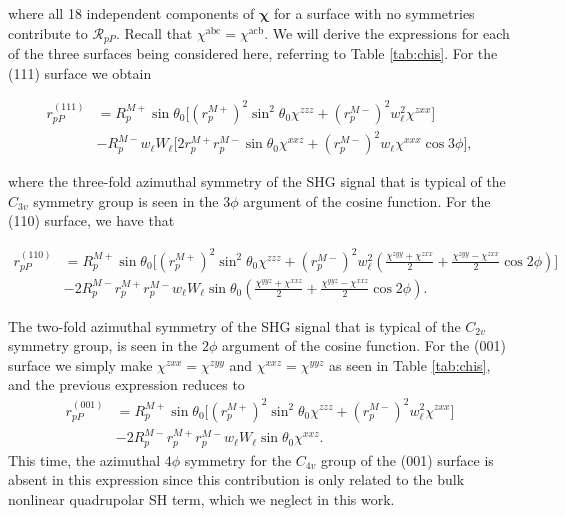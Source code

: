 \documentclass[aps,prb,10pt,showpacs,letterpaper,twocolumn]{revtex4-1}
\begin{document}
where all 18 independent components of $\boldsymbol{\chi}$ for a surface with no
symmetries contribute to $\mathcal{R}_{pP}$. Recall that $\chi^{\mathrm{abc}} =
\chi^{\mathrm{acb}}$. We will derive the expressions for each of the three
surfaces being considered here, referring to Table \ref{tab:chis}. For the (111)
surface we obtain
\begin{widetext}
\begin{equation}\label{eq:rpp111}
\begin{split}
r^{(111)}_{pP} &= 
R^{M+}_{p}\sin\theta_{0}
\Big[
  \left(r^{M+}_{p}\right)^{2}\sin^{2}\theta_{0}\chi^{zzz}
+ \left(r^{M-}_{p}\right)^{2}w^{2}_{\ell}\chi^{zxx}
\Big]\\
&- R^{M-}_{p}w_{\ell}W_{\ell}
\Big[
  2r^{M+}_{p}r^{M-}_{p}\sin\theta_{0}\chi^{xxz}
+ \left(r^{M-}_{p}\right)^{2}w_{\ell}\chi^{xxx}\cos3\phi
\Big],
\end{split}
\end{equation}
\end{widetext}
where the three-fold azimuthal symmetry of the SHG signal that is typical of the
$C_{3v}$ symmetry group is seen in the $3\phi$ argument of the cosine function.
For the (110) surface, we have that
\begin{widetext}
\begin{equation}\label{eq:rpp110}
\begin{split}
r^{(110)}_{pP} &= 
R^{M+}_{p}\sin\theta_{0}
\Bigg[
  \left(r^{M+}_{p}\right)^{2}\sin^{2}\theta_{0}\chi^{zzz}
+ \left(r^{M-}_{p}\right)^{2}w^{2}_{\ell}
\left(
\frac{\chi^{zyy} + \chi^{zxx}}{2} + \frac{\chi^{zyy} - \chi^{zxx}}{2}\cos2\phi 
\right) 
\Bigg]\\
&- 2R^{M-}_{p}r^{M+}_{p}r^{M-}_{p}w_{\ell}W_{\ell}\sin\theta_{0}
\left(
\frac{\chi^{yyz} + \chi^{xxz}}{2} + \frac{\chi^{yyz} - \chi^{xxz}}{2}\cos2\phi 
\right). 
\end{split}
\end{equation}
\end{widetext}
The two-fold azimuthal symmetry of the SHG signal that is typical of the
$C_{2v}$ symmetry group, is seen in the $2\phi$ argument of the cosine function.
For the (001) surface we simply make $\chi^{zxx}=\chi^{zyy}$ and
$\chi^{xxz}=\chi^{yyz}$ as seen in Table \ref{tab:chis}, and the previous
expression reduces to
\begin{equation}\label{rpp001}
\begin{split}
r^{(001)}_{pP} &= 
R^{M+}_{p}\sin\theta_{0}
\bigg[
  \left(r^{M+}_{p}\right)^{2}\sin^{2}\theta_{0}\chi^{zzz}
+ \left(r^{M-}_{p}\right)^{2}w^{2}_{\ell}\chi^{zxx}
\bigg]\\
&- 2R^{M-}_{p}r^{M+}_{p}r^{M-}_{p}w_{\ell}W_{\ell}\sin\theta_{0}\chi^{xxz}.
\end{split}
\end{equation}
This time, the azimuthal $4\phi$ symmetry for the $C_{4v}$ group of the (001)
surface is absent in this  expression since this contribution is only related to
the bulk nonlinear quadrupolar SH term,\cite{sipePRB87} which we neglect in this
work.
\end{document}
